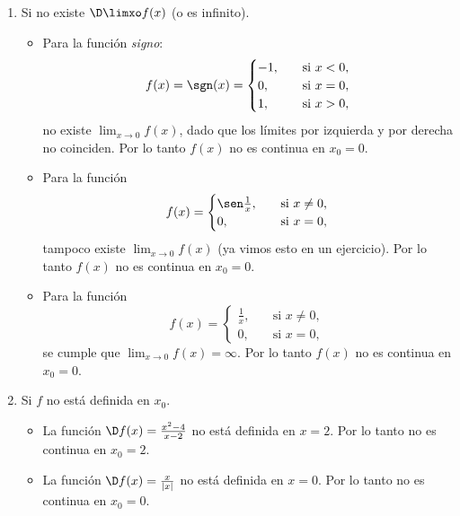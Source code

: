 \begin{enumerate}
    \item Si no existe $\D\limxo f(x)$ (o es infinito).
    \begin{itemize}
        \item Para la función \emph{signo}:
        \[
         f(x) = \sgn(x)  = \begin{cases}
    -1, \quad &\text{si $x<0$},\\
    0, \quad &\text{si $x=0$},\\
    1, \quad &\text{si $x>0$},
    \end{cases}
    \]
    no existe $\lim_{x\to 0} f(x)$, dado que los límites por izquierda y por derecha no coinciden.
    Por lo tanto $f(x)$ no es continua en $x_0=0$.

    \item Para la función
    \[
    f(x) = \begin{cases}
    \sen\frac1x, \quad &\text{si $x\neq0$},\\
    0, \quad &\text{si $x=0$},
    \end{cases}
    \]
    tampoco existe $\lim_{x\to 0} f(x)$ (ya vimos esto en un ejercicio).
    Por lo tanto $f(x)$ no es continua en $x_0=0$.

    \item Para la función 
    \[
    f(x) = \begin{cases}
    \frac1x, \quad &\text{si $x\neq0$},\\
    0, \quad &\text{si $x=0$},
    \end{cases}
    \]
    se cumple que $\lim_{x\to0}f(x) = \infty$.
    Por lo tanto $f(x)$ no es continua en $x_0=0$.
    \end{itemize}

    \item Si $f$ no está definida en $x_0$.
    \begin{itemize}
        \item La función $\D f(x) = \frac{x^2-4}{x-2}$ no está definida en $x=2$.
        Por lo tanto no es continua en $x_0=2$.

        \item La función $\D f(x) = \frac{x}{|x|}$ no está definida en $x=0$.
        Por lo tanto no es continua en $x_0=0$.
    \end{itemize}


\end{enumerate}

